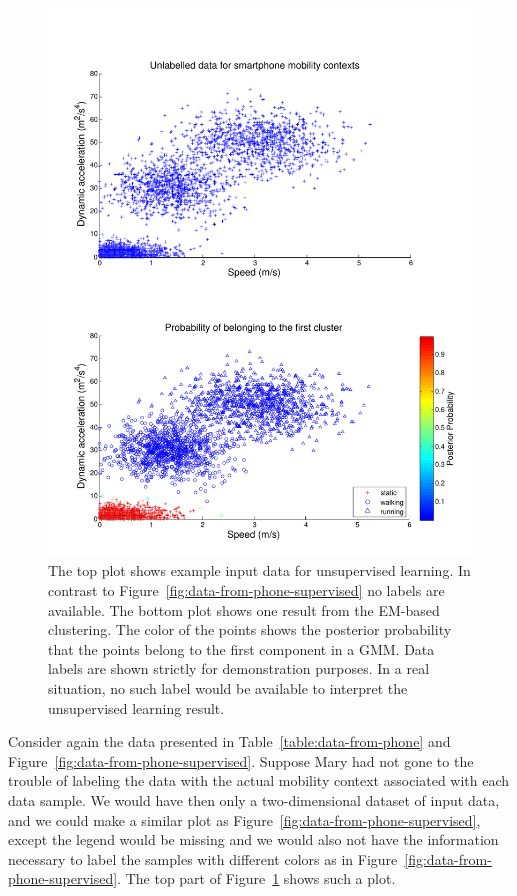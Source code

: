 \begin{figure}
  \begin{center}
    \includegraphics[width=1.0\textwidth]{Images/figChapter3-2}
  \end{center}
  \caption[Input data for unsupervised learning and one clustering result]{The top plot shows example input data for unsupervised learning. In contrast to Figure~\ref{fig:data-from-phone-supervised} no labels are available. The bottom plot shows one result from the EM-based clustering. The color of the points shows the posterior probability that the points belong to the first component in a GMM. Data labels are shown strictly for demonstration purposes. In a real situation, no such label would be available to interpret the unsupervised learning result.}
  \label{fig:data-from-phone-unsupervised}
\end{figure}

Consider again the data presented in Table~\ref{table:data-from-phone} and Figure~\ref{fig:data-from-phone-supervised}. Suppose Mary had not gone to the trouble of labeling the data with the actual mobility context associated with each data sample. We would have then only a two-dimensional dataset of input data, and we could make a similar plot as Figure~\ref{fig:data-from-phone-supervised}, except the legend would be missing and we would also not have the information necessary to label the samples with different colors as in Figure~\ref{fig:data-from-phone-supervised}. The top part of Figure~\ref{fig:data-from-phone-unsupervised} shows such a plot.
%

